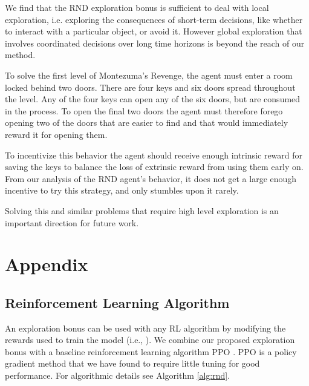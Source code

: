 \documentclass{article} \usepackage[dvipsnames]{xcolor}
\begin{document}
We find that the RND exploration bonus is sufficient to deal with local exploration, i.e. exploring the consequences of short-term decisions, like whether to interact with a particular object, or avoid it. However global exploration that involves coordinated decisions over long time horizons is  beyond the reach of our method.

To solve the first level of Montezuma's Revenge, the agent must enter a room locked behind two doors. There are four keys and six doors spread throughout the level. Any of the four keys can open any of the six doors, but are consumed in the process. To open the final two doors the agent must therefore forego opening two of the doors that are easier to find and that would immediately reward it for opening them.

To incentivize this behavior the agent should receive enough intrinsic reward for saving the keys to balance the loss of extrinsic reward from using them early on. From our analysis of the RND agent's behavior, it does not get a large enough incentive to try this strategy, and only stumbles upon it rarely.

Solving this and similar problems that require high level exploration is an important direction for future work.




\appendix
\section{Appendix}
\subsection{Reinforcement Learning Algorithm}
An exploration bonus can be used with any RL algorithm by modifying the rewards used to train the model (i.e., ). We combine our proposed exploration bonus with a baseline reinforcement learning algorithm PPO \citep{ppo}. PPO is a policy gradient method that we have found to require little tuning for good performance. For algorithmic details see Algorithm \ref{alg:rnd}.
\end{document}
